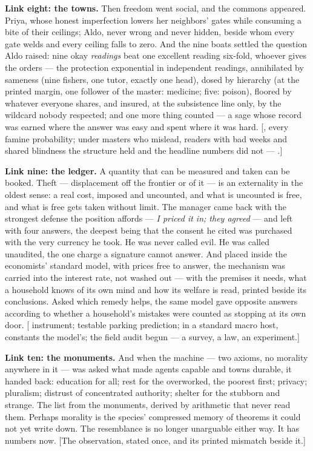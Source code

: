 \textbf{Link eight: the towns.} Then freedom went social, and the commons
appeared. Priya, whose honest imperfection lowers her neighbors'
gates while consuming a bite of their ceilings; Aldo, never wrong and
never hidden, beside whom every gate welds and every ceiling falls to
zero. And the nine boats settled the question Aldo raised: nine okay
\emph{readings} beat one excellent reading six-fold, whoever gives the
orders --- the protection exponential in independent readings,
annihilated by sameness (nine fishers, one
tutor, exactly one head), dosed by hierarchy (at the printed margin,
one follower of the master: medicine; five: poison), floored by
whatever everyone shares, and insured, at the subsistence line only,
by the wildcard nobody respected; and one more thing counted --- a
sage whose record was earned where the answer was easy and spent
where it was hard. {[}, every famine probability;
under masters who mislead, readers with bad weeks and shared
blindness the structure held and the headline numbers did not ---
.{]}

\textbf{Link nine: the ledger.} A quantity that can be measured and taken
can be booked. Theft --- displacement off the frontier or of it --- is an
externality in the oldest sense: a real cost, imposed and uncounted,
and what is uncounted is free, and what is free gets taken without
limit. The manager came back with the strongest defense the position
affords --- \emph{I priced it in; they agreed} --- and left with four answers,
the deepest being that the consent he cited was purchased with the
very currency he took. He was never called evil. He was called
unaudited, the one charge a signature cannot answer. And placed inside
the economists' standard model, with prices free to answer, the
mechanism was carried into the interest rate, not washed out --- with
the premises it needs, what a household knows of its own mind and how
its welfare is read, printed beside its conclusions. Asked which
remedy helps, the same model gave opposite answers according to
whether a household's mistakes were counted as stopping at its own
door. {[}
instrument; testable parking prediction;  in a standard macro
host, constants the model's; the field audit begun --- a survey, a
law, an experiment.{]}

\textbf{Link ten: the monuments.} And when the machine --- two axioms, no
morality anywhere in it --- was asked what made agents capable and
towns durable, it handed back: education for all; rest for the
overworked, the poorest first; privacy; pluralism; distrust of
concentrated authority; shelter for the stubborn and strange. The
list from the monuments, derived by arithmetic that never read them.
Perhaps morality is the species' compressed memory of theorems it
could not yet write down. The resemblance is no longer unarguable
either way. It has numbers now. {[}The observation, stated once, and
its printed mismatch beside it.{]}

